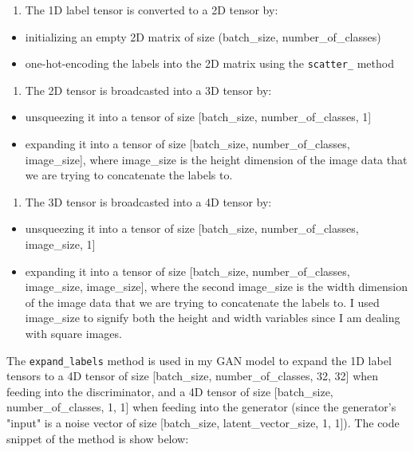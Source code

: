 \documentclass[11pt]{article}
\providecommand{\tightlist}{%
      \setlength{\itemsep}{0pt}\setlength{\parskip}{0pt}}
\begin{document}
\begin{enumerate}
\def\labelenumi{\arabic{enumi})}
\tightlist
\item
  The 1D label tensor is converted to a 2D tensor by:
\end{enumerate}

\begin{itemize}
\tightlist
\item
  initializing an empty 2D matrix of size (batch\_size,
  number\_of\_classes)
\item
  one-hot-encoding the labels into the 2D matrix using the
  \texttt{scatter\_} method
\end{itemize}

\begin{enumerate}
\def\labelenumi{\arabic{enumi})}
\setcounter{enumi}{1}
\tightlist
\item
  The 2D tensor is broadcasted into a 3D tensor by:
\end{enumerate}

\begin{itemize}
\tightlist
\item
  unsqueezing it into a tensor of size {[}batch\_size,
  number\_of\_classes, 1{]}
\item
  expanding it into a tensor of size {[}batch\_size,
  number\_of\_classes, image\_size{]}, where image\_size is the height
  dimension of the image data that we are trying to concatenate the
  labels to.
\end{itemize}

\begin{enumerate}
\def\labelenumi{\arabic{enumi})}
\setcounter{enumi}{2}
\tightlist
\item
  The 3D tensor is broadcasted into a 4D tensor by:
\end{enumerate}

\begin{itemize}
\tightlist
\item
  unsqueezing it into a tensor of size {[}batch\_size,
  number\_of\_classes, image\_size, 1{]}
\item
  expanding it into a tensor of size {[}batch\_size,
  number\_of\_classes, image\_size, image\_size{]}, where the second
  image\_size is the width dimension of the image data that we are
  trying to concatenate the labels to. I used image\_size to signify
  both the height and width variables since I am dealing with square
  images.
\end{itemize}

The \texttt{expand\_labels} method is used in my GAN model to expand the
1D label tensors to a 4D tensor of size {[}batch\_size,
number\_of\_classes, 32, 32{]} when feeding into the discriminator, and
a 4D tensor of size {[}batch\_size, number\_of\_classes, 1, 1{]} when
feeding into the generator (since the generator's "input" is a noise
vector of size {[}batch\_size, latent\_vector\_size, 1, 1{]}). The code
snippet of the method is show below:
\end{document}
